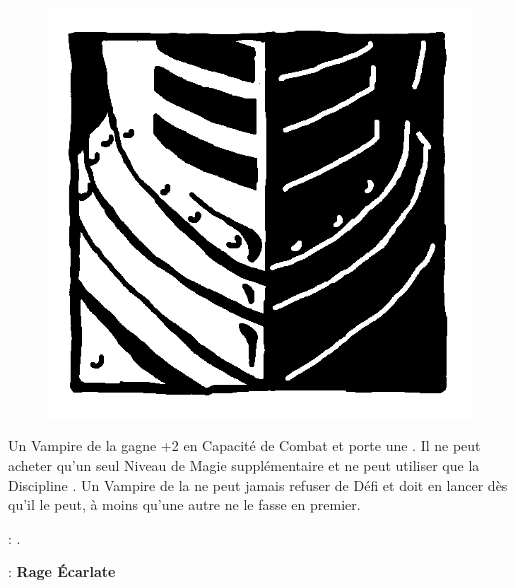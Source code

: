 \begin{figure}
\centering
\includegraphics[width=\logosize]{logos/logo_brotherhood.png}
\end{figure}
Un Vampire de la \brotherhood{} gagne +2 en Capacité de Combat et porte une \platearmour{}. Il ne peut acheter qu'un seul Niveau de Magie supplémentaire et ne peut utiliser que la Discipline \necromancy{}. Un Vampire de la \brotherhood{} ne peut jamais refuser de Défi et doit en lancer dès qu'il le peut, à moins qu'une autre  ne le fasse en premier.

\vspace{0.5cm}
\bloodtie{} : \textbf{\vampireknights{}}.

\vspace{0.5cm}
\ancientbloodpower{} : \textbf{Rage Écarlate}\dotfill{}\newline%


